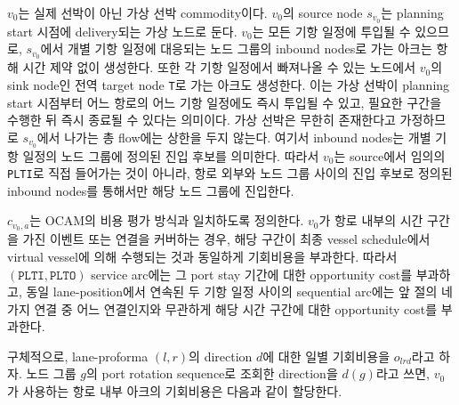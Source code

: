 \documentclass[11pt]{article}
\begin{document}
$v_0$는 실제 선박이 아닌 가상 선박 commodity이다. $v_0$의 source node $s_{v_0}$는
planning start 시점에 delivery되는 가상 노드로 둔다. $v_0$는 모든 기항 일정에
투입될 수 있으므로, $s_{v_0}$에서 개별 기항 일정에 대응되는 노드 그룹의
inbound nodes로 가는 아크는 항해 시간 제약 없이 생성한다. 또한 각 기항 일정에서
빠져나올 수 있는 노드에서
$v_0$의 sink node인 전역 target node \texttt{T}로 가는 아크도 생성한다. 이는 가상
선박이 planning start 시점부터 어느 항로의 어느 기항 일정에도 즉시 투입될 수 있고,
필요한 구간을 수행한 뒤 즉시 종료될 수 있다는 의미이다. 가상 선박은 무한히
존재한다고 가정하므로 $s_{v_0}$에서 나가는 총 flow에는 상한을 두지 않는다.
여기서 inbound nodes는 개별 기항 일정의 노드 그룹에 정의된 진입 후보를 의미한다.
따라서
$v_0$는 source에서 임의의 \texttt{PLTI}로 직접 들어가는 것이 아니라, 항로 외부와
노드 그룹 사이의 진입 후보로 정의된 inbound nodes를 통해서만 해당 노드 그룹에
진입한다.

$c_{v_0,a}$는 OCAM의 비용 평가 방식과 일치하도록 정의한다. $v_0$가 항로 내부의
시간 구간을 가진 이벤트 또는 연결을 커버하는 경우, 해당 구간이 최종 vessel
schedule에서 virtual vessel에 의해 수행되는 것과 동일하게 기회비용을 부과한다.
따라서 $(\texttt{PLTI},\texttt{PLTO})$ service arc에는 그 port stay 기간에 대한
opportunity cost를 부과하고, 동일 lane-position에서 연속된 두 기항 일정 사이의
sequential arc에는 앞 절의 네 가지 연결 중 어느 연결인지와 무관하게 해당 시간
구간에 대한 opportunity cost를 부과한다.

구체적으로, lane-proforma $(l,r)$의 direction $d$에 대한 일별 기회비용을
$o_{lrd}$라고 하자. 노드 그룹 $g$의 port rotation sequence로 조회한 direction을
$d(g)$라고 쓰면, $v_0$가 사용하는 항로 내부 아크의 기회비용은 다음과 같이
할당한다.
\end{document}

